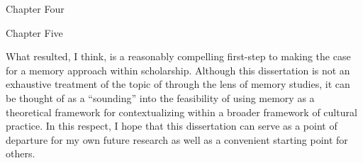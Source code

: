 Chapter Four

Chapter Five



What resulted, I think, is a reasonably compelling first-step to making the case for a memory approach within \rwb scholarship. Although this dissertation is not an exhaustive treatment of the topic of \rwb through the lens of memory studies, it can be thought of as a ``sounding'' into the feasibility of using memory as a theoretical framework for contextualizing \rwb within a broader framework of cultural practice. In this respect, I hope that this dissertation can serve as a point of departure for my own future research as well as a convenient starting point for others. 